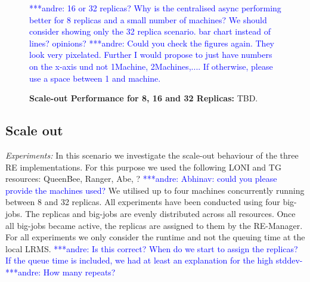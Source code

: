 \documentclass{rspublic}
\newcommand{\alnote}[1]{ {\textcolor{blue} { ***andre: #1 }}}
\newcommand{\alnote}[1]{}
\begin{document}
{%
\begin{figure}%
\centering
{}\qquad
\caption{\textbf{Scale-out Performance for 8, 16 and 32 Replicas:} 
  TBD.}
  \alnote{16 or 32 replicas? Why is the centralised async performing better for 8 replicas and a small number of machines? We should consider showing only the 32 replica scenario. bar chart instead of lines? opinions?}
\alnote{Could you check the figures again. They look very pixelated. Further I would propose to just have numbers on the x-axis und not 1Machine, 2Machines,.... If otherwise, please use a space between 1 and machine.}
\label{fig:24machines}

\end{figure}

\subsection{Scale out}

{\it Experiments:} In this scenario we investigate the scale-out behaviour
of the three RE implementations. For this purpose we used the following
LONI and TG resources: QueenBee, Ranger, Abe, ?\alnote{Abhinav: could you
please provide the machines used?}  We utilised up to four machines concurrently
running between 8 and 32 replicas. All experiments have been conducted using four big-jobs.
The replicas and big-jobs are evenly distributed across all resources. Once all big-jobs became 
active, the replicas are assigned to them by the RE-Manager. For all
experiments we only consider the runtime and not the queuing time at the local 
LRMS. \alnote{Is this correct? When do we start to assign the replicas? If the 
queue time is included, we had at least an explanation for the high stddev-}
\alnote{How many repeats?}

}
\end{document}
